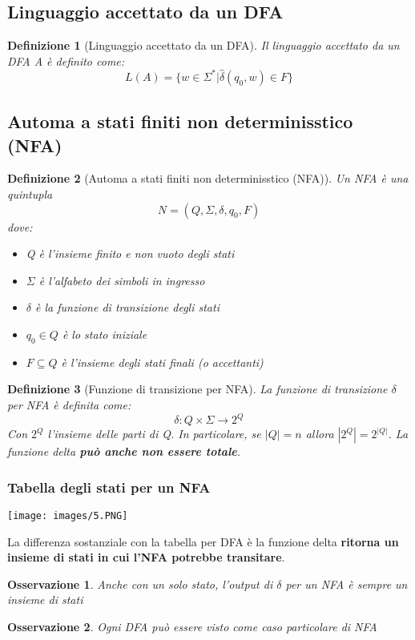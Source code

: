 \documentclass[12pt]{article}
\newtheorem{Definizione}{Definizione}[subsection]
\newtheorem{Osservazione}{Osservazione}[subsection]
\begin{document}
\subsection{Linguaggio accettato da un DFA}
\begin{Definizione}[Linguaggio accettato da un DFA]
    Il linguaggio accettato da un DFA A è definito come:
    $$L(A) = \{w \in \Sigma^* | \hat{\delta}(q_0, w) \in F \}$$
\end{Definizione}
\subsection{Automa a stati finiti non determinisstico (NFA)}
\begin{Definizione}[Automa a stati finiti non determinisstico (NFA)]
Un NFA è una quintupla $$N = (Q, \Sigma, \delta, q_0, F)$$
dove:
\begin{itemize}
        \item Q è l'insieme finito e non vuoto degli stati
        \item $\Sigma$ è l'alfabeto dei simboli in ingresso
        \item $\delta$ è la funzione di transizione degli stati
        \item $q_0 \in Q$ è lo stato iniziale
        \item $F \subseteq Q$ è l'insieme degli stati finali (o accettanti)
    \end{itemize}
\end{Definizione}
\begin{Definizione}[Funzione di transizione per NFA]
La funzione di transizione $\delta$ per NFA è definita come:
$$\delta: Q \times \Sigma \to 2^Q$$
Con $2^Q$ l'insieme delle parti di Q. In particolare, se $|Q| = n$ allora $|2^Q| = 2^{|Q|}$. La funzione delta \textbf{può anche non essere totale}.
\end{Definizione}
\subsubsection{Tabella degli stati per un NFA}
\begin{center}
    \texttt{[image: images/5.PNG]}
\end{center}
La differenza sostanziale con la tabella per DFA è la funzione delta \textbf{ritorna un insieme di stati in cui l'NFA potrebbe transitare}.
\begin{Osservazione}
    Anche con un solo stato, l'output di $\delta$ per un NFA è sempre un insieme di stati
\end{Osservazione}
\begin{Osservazione}
    Ogni DFA può essere visto come caso particolare di NFA
\end{Osservazione}
\end{document}
